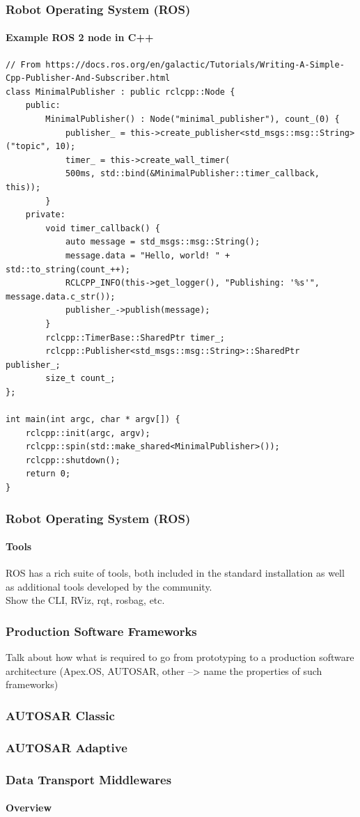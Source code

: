 \begin{frame}[fragile]
\frametitle{Robot Operating System (ROS)}
\framesubtitle{Example ROS 2 node in C++}
\tiny
\begin{verbatim}
// From https://docs.ros.org/en/galactic/Tutorials/Writing-A-Simple-Cpp-Publisher-And-Subscriber.html
class MinimalPublisher : public rclcpp::Node {
    public:
        MinimalPublisher() : Node("minimal_publisher"), count_(0) {
            publisher_ = this->create_publisher<std_msgs::msg::String>("topic", 10);
            timer_ = this->create_wall_timer(
            500ms, std::bind(&MinimalPublisher::timer_callback, this));
        }
    private:
        void timer_callback() {
            auto message = std_msgs::msg::String();
            message.data = "Hello, world! " + std::to_string(count_++);
            RCLCPP_INFO(this->get_logger(), "Publishing: '%s'", message.data.c_str());
            publisher_->publish(message);
        }
        rclcpp::TimerBase::SharedPtr timer_;
        rclcpp::Publisher<std_msgs::msg::String>::SharedPtr publisher_;
        size_t count_;
};

int main(int argc, char * argv[]) {
    rclcpp::init(argc, argv);
    rclcpp::spin(std::make_shared<MinimalPublisher>());
    rclcpp::shutdown();
    return 0;
}
\end{verbatim}
\end{frame}

\begin{frame}
\frametitle{Robot Operating System (ROS)}
\framesubtitle{Tools}
ROS has a rich suite of tools, both included in the standard installation as
well as additional tools developed by the community.\\
Show the CLI, RViz, rqt, rosbag, etc.
\end{frame}

\begin{frame}
\frametitle{Production Software Frameworks}
Talk about how what is required to go from prototyping to a production
software architecture (Apex.OS, AUTOSAR, other --> name the properties
of such frameworks)
\end{frame}

\begin{frame}
\frametitle{AUTOSAR Classic}
\end{frame}

\begin{frame}
\frametitle{AUTOSAR Adaptive}
\end{frame}

\begin{frame}
\frametitle{Data Transport Middlewares}
\framesubtitle{Overview}
\end{frame}

